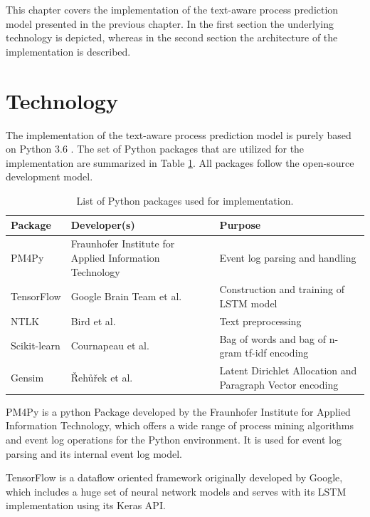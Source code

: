 This chapter covers the implementation of the text-aware process prediction model presented in the previous chapter.
In the first section the underlying technology is depicted, whereas in the second section the architecture of the implementation is described.

\section{Technology}

The implementation of the text-aware process prediction model is purely based on Python 3.6 \cite{python}.
The set of Python packages that are utilized for the implementation are summarized in Table \ref{tab:packages}.
All packages follow the open-source development model.

\begin{table}[!htbp]
	\begin{tabularx}{\textwidth}{l p{4.5cm} p{6.6cm} }
		\toprule
		\textbf{Package} & \textbf{Developer(s)} & \textbf{Purpose}  \\
		\midrule
		PM4Py \cite{DBLP:journals/corr/abs-1905-06169}   &  Fraunhofer Institute for Applied Information Technology &  Event log parsing and handling\\
		TensorFlow \cite{DBLP:journals/corr/AbadiABBCCCDDDG16} &  Google Brain Team et al.& Construction and training of LSTM model \\
		NTLK \cite{DBLP:books/daglib/0022921} & Bird et al. & Text preprocessing\\
		Scikit-learn \cite{DBLP:journals/jmlr/PedregosaVGMTGBPWDVPCBPD11} & Cournapeau et al.& Bag of words and bag of n-gram tf-idf encoding \\
		Gensim \cite{rehurek_lrec} & Řehůřek et al. & Latent Dirichlet Allocation and Paragraph Vector encoding \\
		 \bottomrule
	\end{tabularx}
	\caption[List of Python packages used for implementation]{List of Python packages used for implementation.}
	\label{tab:packages}
\end{table}

PM4Py \cite{DBLP:journals/corr/abs-1905-06169} is a python Package developed by the Fraunhofer Institute for Applied Information Technology, which offers a wide range of process mining algorithms and event log operations for the Python environment.
It is used for event log parsing and its internal event log model.

TensorFlow \cite{DBLP:journals/corr/AbadiABBCCCDDDG16} is a dataflow oriented framework originally developed by Google, which includes a huge set of neural network models and serves with its LSTM implementation using its Keras API.

